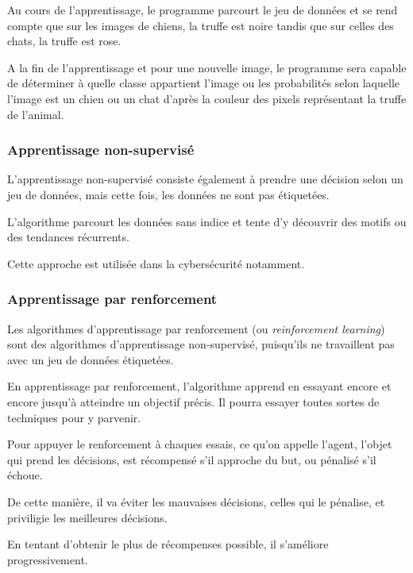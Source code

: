 \documentclass[
12pt,
french,
]{article}
\begin{document}
Au cours de l'apprentissage, le programme parcourt le jeu de données et
se rend compte que sur les images de chiens, la truffe est noire tandis
que sur celles des chats, la truffe est rose.

A la fin de l'apprentissage et pour une nouvelle image, le programme
sera capable de déterminer à quelle classe appartient l'image ou les
probabilités selon laquelle l'image est un chien ou un chat d'après la
couleur des pixels représentant la truffe de l'animal.

\hypertarget{apprentissage-non-supervisuxe9}{%
\subsubsection{Apprentissage
non-supervisé}\label{apprentissage-non-supervisuxe9}}

L'apprentissage non-supervisé consiste également à prendre une décision
selon un jeu de données, mais cette fois, les données ne sont pas
étiquetées.

L'algorithme parcourt les données sans indice et tente d'y découvrir des
motifs ou des tendances récurrents.

Cette approche est utilisée dans la cybersécurité notamment.

\hypertarget{apprentissage-par-renforcement}{%
\subsubsection{Apprentissage par
renforcement}\label{apprentissage-par-renforcement}}

Les algorithmes d'apprentissage par renforcement (ou \emph{reinforcement
learning}) sont des algorithmes d'apprentissage non-supervisé,
puisqu'ils ne travaillent pas avec un jeu de données étiquetées.

En apprentissage par renforcement, l'algorithme apprend en essayant
encore et encore jusqu'à atteindre un objectif précis. Il pourra essayer
toutes sortes de techniques pour y parvenir.

Pour appuyer le renforcement à chaques essais, ce qu'on appelle l'agent,
l'objet qui prend les décisions, est récompensé s'il approche du but, ou
pénalisé s'il échoue.

De cette manière, il va éviter les mauvaises décisions, celles qui le
pénalise, et priviligie les meilleures décisions.

En tentant d'obtenir le plus de récompenses possible, il s'améliore
progressivement.
\end{document}
